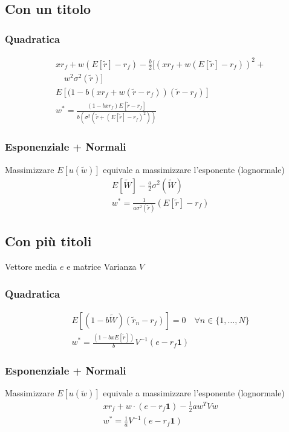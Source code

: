 \documentclass[a4paper,notitlepage]{report}%
\begin{document}
\begin{multicols*}{2}
    \subsection*{Con un titolo}

    \subsubsection*{Quadratica}
    \begin{align*}
        & xr_f+w(E[\tilde{r}]-r_f)-\frac{b}{2} [(xr_f+w(E[\tilde{r}]-r_f))^2+\\
        &\quad w^2\sigma^2(\tilde{r})] \\
        & E[(1-b(xr_f + w (\tilde{r}-r_f) ) (\tilde{r}-r_f)] \\
        & w^* = \frac{(1-bxr_f) E[\tilde{r}-r_f]}{ b (\sigma^2(\tilde{r} + (E[\tilde{r}]-r_f)^2))}
    \end{align*}

    \subsubsection*{Esponenziale + Normali}
    Massimizzare $E[u(\tilde{w})]$ equivale a massimizzare l'esponente (lognormale)
    \begin{align*}
        & E[\tilde{W}]-\frac{a}{2}\sigma^2(\tilde{W})\\
        & w^* = \frac{1}{a\sigma^2(\tilde{r})}(E[\tilde{r}]-r_f)
    \end{align*}

    \subsection*{Con più titoli}
    Vettore media $e$ e matrice Varianza $V$

    \subsubsection*{Quadratica}
    \begin{align*}
        & E[(1-b\tilde{W}) (\tilde{r}_n-r_f)]=0 \quad \forall n \in \{ 1,\dots,N \} \\
        & w^* = \frac{(1-bxE[\tilde{r}])}{b} V^{-1}(e-r_f\mathbf{1})
    \end{align*}

    \subsubsection*{Esponenziale + Normali}
    Massimizzare $E[u(\tilde{w})]$ equivale a massimizzare l'esponente (lognormale)
    \begin{align*}
        & xr_f + w\cdot (e-r_f\mathbf{1})-\frac{1}{2} aw^TVw\\
        & w^* = \frac{1}{a} V^{-1}(e-r_f\mathbf{1})
    \end{align*}



\end{multicols*}
\end{document}
